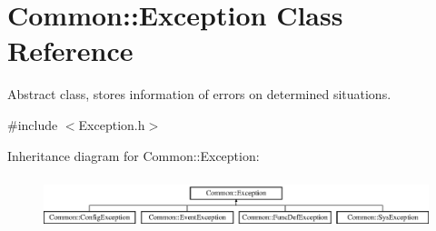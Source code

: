 \hypertarget{class_common_1_1_exception}{\section{Common\-:\-:Exception Class Reference}
\label{class_common_1_1_exception}
}


Abstract class, stores information of errors on determined situations.  




{\ttfamily \#include $<$Exception.\-h$>$}

Inheritance diagram for Common\-:\-:Exception\-:\begin{figure}[H]
\begin{center}
\leavevmode
\includegraphics[height=1.573034cm]{class_common_1_1_exception}
\end{center}
\end{figure}
